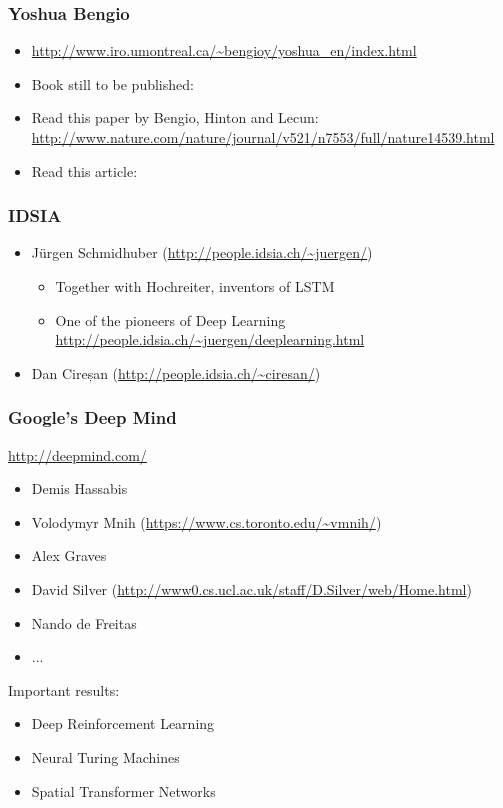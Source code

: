 \begin{frame}
  \frametitle{Yoshua Bengio}
  \begin{itemize}
  \item {\scriptsize \url{http://www.iro.umontreal.ca/~bengioy/yoshua_en/index.html}}
  \item Book still to be published:\\
  \item Read this paper by Bengio, Hinton and Lecun: \\
    \url{http://www.nature.com/nature/journal/v521/n7553/full/nature14539.html}
  \item Read this article:
    \begin{center}
    \end{center}
  \end{itemize}
\end{frame}

\begin{frame}
  \frametitle{IDSIA}
  \begin{itemize}
  \item Jürgen Schmidhuber (\url{http://people.idsia.ch/~juergen/})
    \begin{itemize}
    \item Together with Hochreiter, inventors of LSTM \cite{hochreiter1997long}
    \item One of the pioneers of Deep Learning
      \url{http://people.idsia.ch/~juergen/deeplearning.html}
    \end{itemize}
  \item Dan Cireșan (\url{http://people.idsia.ch/~ciresan/})
  \end{itemize}
\end{frame}

\begin{frame}
  \frametitle{Google's Deep Mind}
  \begin{center}
    \url{http://deepmind.com/}
  \end{center}
  \begin{itemize}
  \item Demis Hassabis
  \item Volodymyr Mnih (\url{https://www.cs.toronto.edu/~vmnih/})
  \item Alex Graves
  \item David Silver (\url{http://www0.cs.ucl.ac.uk/staff/D.Silver/web/Home.html})
  \item Nando de Freitas
  \item ...
  \end{itemize}
  Important results:
  \begin{itemize}
  \item Deep Reinforcement Learning \cite{mnih-dqn-2015}
  \item Neural Turing Machines \cite{graves2014neural}
  \item Spatial Transformer Networks \cite{jaderberg2015spatial}
  \end{itemize}
\end{frame}


